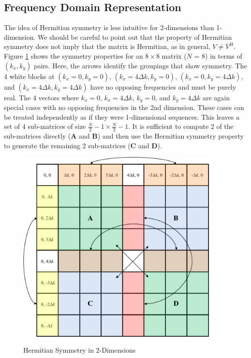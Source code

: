 \subsection{Frequency Domain Representation}
The idea of Hermitian symmetry is less intuitive for 2-dimensions than 1-dimension. We should be careful to point out that the property of Hermitian symmetry does not imply that the matrix is Hermitian, as in general, $V \neq V^H$. Figure \ref{os_fig:7dd} shows the symmetry properties for an $8 \times 8$ matrix ($N$ = 8) in terms of $(k_x, k_y)$ pairs. Here, the arrows identify the groupings that show symmetry. The 4 white blocks at $(k_x=0, k_y=0)$, $(k_x=4\Delta k, k_y=0)$, $(k_x=0, k_y=4\Delta k)$, and $(k_x=4\Delta k, k_y=4\Delta k)$ have no opposing frequencies and must be purely real. The 4 vectors where $k_x = 0$, $k_x = 4\Delta k$, $k_y = 0$, and $k_y = 4\Delta k$ are again special cases with no opposing frequencies in the 2nd dimension. These cases can be treated independently as if they were 1-dimensional sequences. This leaves a set of 4 sub-matrices of size $\frac{N}{2} - 1 \times \frac{N}{2} - 1$. It is sufficient to compute 2 of the sub-matrices directly ($\mathbf{A}$ and $\mathbf{B}$) and then use the Hermitian symmetry property to generate the remaining 2 sub-matrices ($\mathbf{C}$ and $\mathbf{D}$).
\begin{figure}[H]
  \begin{center}
\includegraphics[width=4in]{../media/Ocean_Surface/2-d_hermitian_symmetry.png}
  \end{center}
  \renewcommand{\baselinestretch}{1} \small\normalsize
  \begin{quote}
    \caption[Hermitian Symmetry in 2-Dimensions]{Hermitian Symmetry in 2-Dimensions \label{os_fig:7dd}}
  \end{quote}
\end{figure}
\renewcommand{\baselinestretch}{2} \small\normalsize

